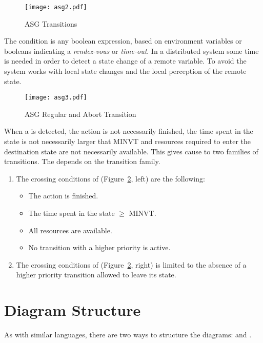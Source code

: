 \documentclass[../main.tex]{subfiles}
\begin{document}
\begin{figure}[H]
    \centering
    \texttt{[image: asg2.pdf]}
    \caption{ASG Transitions}
    \label{asg2}
\end{figure}

The condition is any boolean expression, based on environment variables or booleans indicating a \textit{rendez-vous} or \textit{time-out}.
In a distributed system some time is needed in order to detect a state change of a remote variable.
To avoid  the system works with local state changes and the local perception of the remote state.
\begin{figure}[H]
    \centering
    \texttt{[image: asg3.pdf]}
    \caption{ASG Regular and Abort Transition}
    \label{asg3}
\end{figure}
When a  is detected, the action is not necessarily finished, the time spent in the state is not necessarily larger that MINVT and resources required to enter the destination state are not necessarily available. This gives cause to two families of transitions. The  depends on the transition family.
\begin{enumerate}
	\item  The crossing conditions of  (Figure~\ref{asg3}, left) are the following:
	\begin{itemize}
		\item The action is finished.
		\item The time spent in the state $\geq$ MINVT.
		\item All resources are available.
		\item No transition with a higher priority is active.
	\end{itemize}
	\item The crossing conditions of  (Figure~\ref{asg3}, right) is limited to the absence of a higher priority transition allowed to leave its state.
\end{enumerate}

\section{Diagram Structure}
As with similar languages, there are two ways to structure the diagrams:  and .
\end{document}
